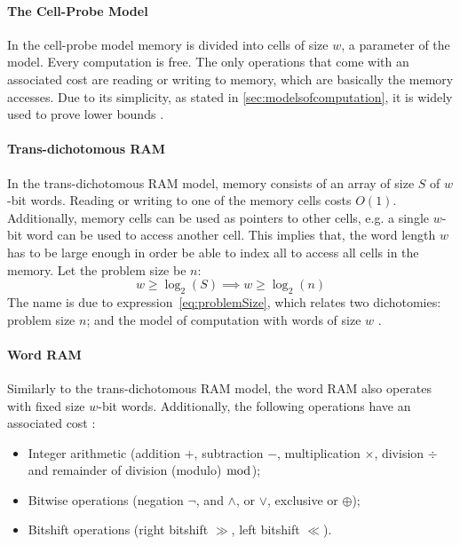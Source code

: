 \paragraph{The Cell-Probe Model}
In the cell-probe model memory is divided into cells of size $w$, a parameter of the model. Every computation is free.
The only operations that come with an associated cost are reading or writing to memory, which are basically the memory accesses.
Due to its simplicity, as stated in \ref{sec:modelsofcomputation}, it is widely used to prove lower bounds \cite{erikdemainelec11}.

\paragraph{Trans-dichotomous RAM}
In the trans-dichotomous RAM model, memory consists of an array of size $S$ of $w$-bit words.
Reading or writing to one of the memory cells costs $O(1)$.
Additionally, memory cells can be used as pointers to other cells, e.g. a single $w$-bit word can be used to access another cell.
This implies that, the word length $w$ has to be large enough in order be able to index all to access all cells in the memory.
Let the problem size be $n$:
\begin{equation}\label{eq:problemSize}
    w \ge \log_2(S) \implies w \ge \log_2(n)
\end{equation}
The name is due to expression~\ref{eq:problemSize}, which relates two dichotomies: problem size $n$; and the model of computation with words of size $w$ \cite{erikdemainelec11}. 

\paragraph{Word RAM}
Similarly to the trans-dichotomous RAM model, the word RAM also operates with fixed size $w$-bit words. Additionally, the following operations have an associated cost \cite{nelsonjelanilec1}:
\begin{itemize}
    \item Integer arithmetic (addition $+$, subtraction $-$, multiplication $\times$, division $\div$ and remainder of division (modulo) $\bmod$);
    \item Bitwise operations (negation $\neg$, and $\wedge$, or $\vee$, exclusive or $\oplus$);
    \item Bitshift operations (right bitshift $\gg$, left bitshift $\ll$).
\end{itemize}

